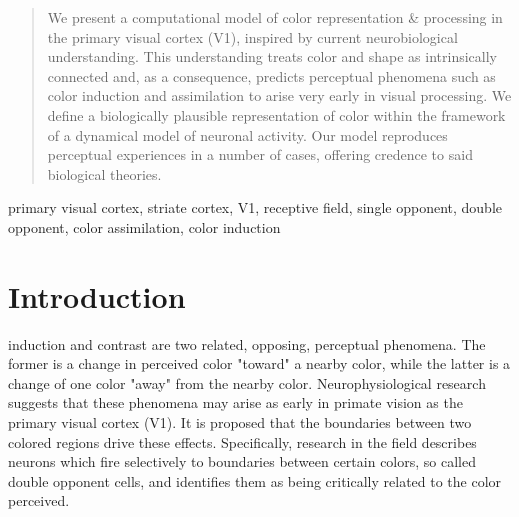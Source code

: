 \documentclass[journal,onecolumn]{IEEEtran}
\begin{document}
\begin{abstract}
We present a computational model of color representation \& processing in the primary visual cortex (V1), inspired by current neurobiological understanding. This understanding treats color and shape as intrinsically connected and, as a consequence, predicts perceptual phenomena such as color induction and assimilation to arise very early in visual processing. We define a biologically plausible representation of color within the framework of a dynamical model of neuronal activity. Our model reproduces perceptual experiences in a number of cases, offering credence to said biological theories.
\end{abstract}

\begin{IEEEkeywords}
primary visual cortex, striate cortex, V1, receptive field, single opponent, double opponent, color assimilation, color induction
\end{IEEEkeywords}


%
\IEEEpeerreviewmaketitle



\section{Introduction}


 induction and contrast are two related, opposing, perceptual phenomena. The former is a change in perceived color "toward" a nearby color, while the latter is a change of one color "away" from the nearby color. Neurophysiological research suggests that these phenomena may arise as early in primate vision as the primary visual cortex (V1). It is proposed that the boundaries between two colored regions drive these effects. Specifically, research in the field describes neurons which fire selectively to boundaries between certain colors, so called double opponent cells, and identifies them as being critically related to the color perceived.
\end{document}
